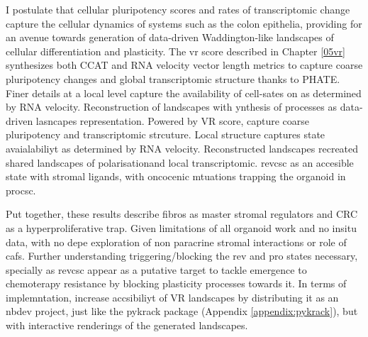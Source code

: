 I postulate that cellular pluripotency scores and rates of transcriptomic change capture the cellular dynamics of systems such as the colon epithelia, providing for an avenue towards generation of data-driven Waddington-like landscapes of cellular differentiation and plasticity. The \acrfull{vr} score described in Chapter \ref{05vr} synthesizes both CCAT and RNA velocity vector length metrics to capture coarse pluripotency changes and global transcriptomic structure thanks to PHATE. Finer details at a local level capture the availability of cell-sates on as determined by RNA velocity. Reconstruction of landscapes with ynthesis of processes as data-driven lasncapes representation. Powered by VR score, capture coarse pluripotency and transcriptomic strcuture. Local structure captures state avaialabiliyt as determined by RNA velocity.
Reconstructed landscapes recreated shared landscapes of polarisationand local transcriptomic. revcsc as an accesible state with stromal ligands, with oncocenic mtuations trapping the organoid in procsc.

Put together, these results describe fibros as master stromal regulators and CRC as a hyperproliferative trap. Given limitations of all organoid work and no insitu data, with no depe exploration of non paracrine stromal interactions or role of cafs. Further understanding triggering/blocking the rev and pro states necessary, specially as revcsc appear as a putative target to tackle emergence to chemoterapy resistance by blocking plasticity processes towards it. In terms of implemntation, increase accsibiliyt of VR landscapes by distributing it as an nbdev project, just like the pykrack package (Appendix \ref{appendix:pykrack}), but with interactive renderings of the generated landscapes. 


